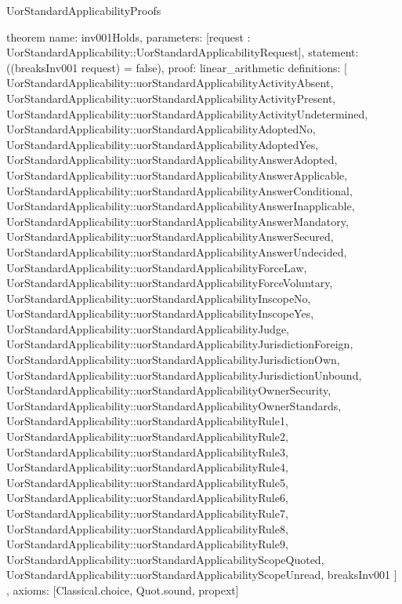 \begin{lexlean}{UorStandardApplicabilityProofs}
\begin{semanticmodule}
theorem{
  name: inv001Holds,
  parameters: [request : UorStandardApplicability::UorStandardApplicabilityRequest],
  statement: ((breaksInv001 request) = false),
  proof: linear_arithmetic{
    definitions: [
      UorStandardApplicability::uorStandardApplicabilityActivityAbsent,
      UorStandardApplicability::uorStandardApplicabilityActivityPresent,
      UorStandardApplicability::uorStandardApplicabilityActivityUndetermined,
      UorStandardApplicability::uorStandardApplicabilityAdoptedNo,
      UorStandardApplicability::uorStandardApplicabilityAdoptedYes,
      UorStandardApplicability::uorStandardApplicabilityAnswerAdopted,
      UorStandardApplicability::uorStandardApplicabilityAnswerApplicable,
      UorStandardApplicability::uorStandardApplicabilityAnswerConditional,
      UorStandardApplicability::uorStandardApplicabilityAnswerInapplicable,
      UorStandardApplicability::uorStandardApplicabilityAnswerMandatory,
      UorStandardApplicability::uorStandardApplicabilityAnswerSecured,
      UorStandardApplicability::uorStandardApplicabilityAnswerUndecided,
      UorStandardApplicability::uorStandardApplicabilityForceLaw,
      UorStandardApplicability::uorStandardApplicabilityForceVoluntary,
      UorStandardApplicability::uorStandardApplicabilityInscopeNo,
      UorStandardApplicability::uorStandardApplicabilityInscopeYes,
      UorStandardApplicability::uorStandardApplicabilityJudge,
      UorStandardApplicability::uorStandardApplicabilityJurisdictionForeign,
      UorStandardApplicability::uorStandardApplicabilityJurisdictionOwn,
      UorStandardApplicability::uorStandardApplicabilityJurisdictionUnbound,
      UorStandardApplicability::uorStandardApplicabilityOwnerSecurity,
      UorStandardApplicability::uorStandardApplicabilityOwnerStandards,
      UorStandardApplicability::uorStandardApplicabilityRule1,
      UorStandardApplicability::uorStandardApplicabilityRule2,
      UorStandardApplicability::uorStandardApplicabilityRule3,
      UorStandardApplicability::uorStandardApplicabilityRule4,
      UorStandardApplicability::uorStandardApplicabilityRule5,
      UorStandardApplicability::uorStandardApplicabilityRule6,
      UorStandardApplicability::uorStandardApplicabilityRule7,
      UorStandardApplicability::uorStandardApplicabilityRule8,
      UorStandardApplicability::uorStandardApplicabilityRule9,
      UorStandardApplicability::uorStandardApplicabilityScopeQuoted,
      UorStandardApplicability::uorStandardApplicabilityScopeUnread,
      breaksInv001
    ]
  },
  axioms: [Classical.choice, Quot.sound, propext]
}


\end{semanticmodule}
\end{lexlean}
